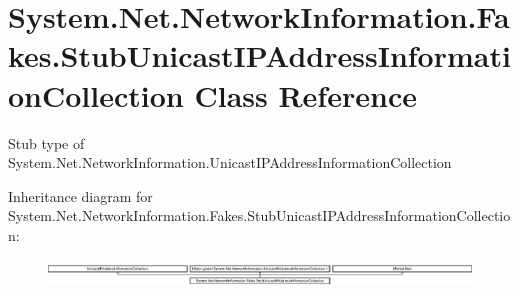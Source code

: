 \hypertarget{class_system_1_1_net_1_1_network_information_1_1_fakes_1_1_stub_unicast_i_p_address_information_collection}{\section{System.\-Net.\-Network\-Information.\-Fakes.\-Stub\-Unicast\-I\-P\-Address\-Information\-Collection Class Reference}
\label{class_system_1_1_net_1_1_network_information_1_1_fakes_1_1_stub_unicast_i_p_address_information_collection}
}


Stub type of System.\-Net.\-Network\-Information.\-Unicast\-I\-P\-Address\-Information\-Collection 


Inheritance diagram for System.\-Net.\-Network\-Information.\-Fakes.\-Stub\-Unicast\-I\-P\-Address\-Information\-Collection\-:\begin{figure}[H]
\begin{center}
\leavevmode
\includegraphics[height=0.737813cm]{class_system_1_1_net_1_1_network_information_1_1_fakes_1_1_stub_unicast_i_p_address_information_collection}
\end{center}
\end{figure}
